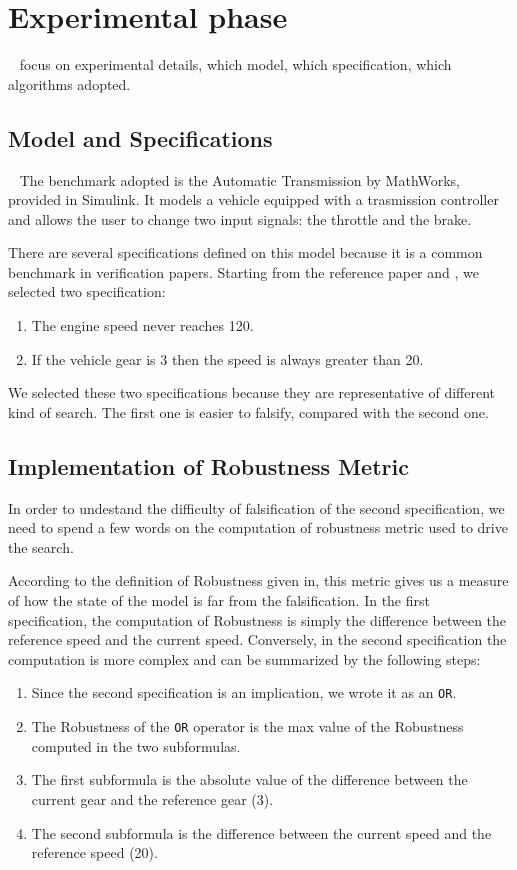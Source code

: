 \documentclass[11pt]{article}
\begin{document}
\pagebreak

\section{Experimental phase}~\label{sec:exp}
focus on experimental details, which model, which specification, which algorithms adopted.

\subsection{Model and Specifications}~\label{sec:exp:spec}
The benchmark adopted is the Automatic Transmission by MathWorks, provided in Simulink. It models a vehicle equipped with a trasmission controller and allows the user to change two input signals: the     throttle and the brake.

There are several specifications defined on this model because it is a common benchmark in verification papers. Starting from the reference paper and \cite{bardh2014benchmarks}, we selected two           specification:

\begin{enumerate}
    \item The engine speed never reaches 120.
    \item If the vehicle gear is 3 then the speed is always greater than 20.
\end{enumerate}

We selected these two specifications because they are representative of different kind of search. The first one is easier to falsify, compared with the second one.

\subsection{Implementation of Robustness Metric}
In order to undestand the difficulty of falsification of the second specification, we need to spend a few words on the computation of robustness metric used to drive the search.

According to the definition of Robustness given in\cite{fainekos2006robustness}, this metric gives us a measure of how the state of the model is far from the falsification. In the first specification,    the computation of Robustness is simply the difference between the reference speed and the current speed. Conversely, in the second specification the computation is more complex and can be summarized by  the following steps:

\begin{enumerate}
\item Since the second specification is an implication, we wrote it as an \texttt{OR}.
\item The Robustness of the \texttt{OR} operator is the max value of the Robustness computed in the two subformulas.
\item The first subformula is the absolute value of the difference between the current gear and the reference gear (3).
\item The second subformula is the difference between the current speed and the reference speed (20).
\end{enumerate}
\end{document}
